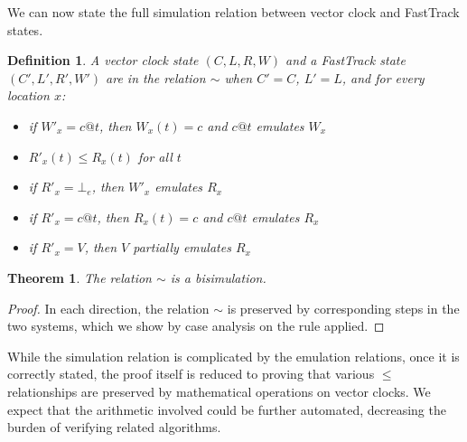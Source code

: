 \documentclass[preprint, 10pt]{sigplanconf}
\newtheorem{theorem}{Theorem}
\newtheorem{definition}{Definition}
\begin{document}
We can now state the full simulation relation between vector clock and FastTrack states.
\begin{definition}A vector clock state $(C, L, R, W)$ and a FastTrack state $(C', L', R', W')$ are in the relation $\sim$ when $C' = C$, $L' = L$, and for every location $x$:
\begin{itemize}
\item if $W'_x = c@t$, then $W_x(t) = c$ and $c@t$ emulates $W_x$
\item $R'_x(t) \le R_x(t)$ for all $t$
\item if $R'_x = \bot_e$, then $W'_x$ emulates $R_x$
\item if $R'_x = c@t$, then $R_x(t) = c$ and $c@t$ emulates $R_x$
\item if $R'_x = V$, then $V$ partially emulates $R_x$
\end{itemize}
\end{definition}
\begin{theorem}The relation $\sim$ is a bisimulation.\end{theorem}
\begin{proof}In each direction, the relation $\sim$ is preserved by corresponding steps in the two systems, which we show by case analysis on the rule applied.\end{proof}

While the simulation relation is complicated by the emulation relations, once it is correctly stated, the proof itself is reduced to proving that various $\le$ relationships are preserved by mathematical operations on vector clocks. We expect that the arithmetic involved could be further automated, decreasing the burden of verifying related algorithms.
\end{document}
